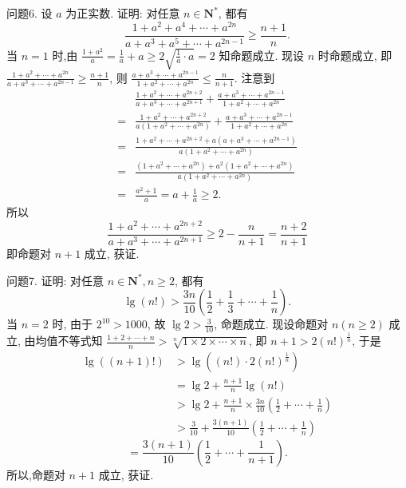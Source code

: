 问题6. 设 $a$ 为正实数.
证明: 对任意 $n \in \mathbf{N}^*$, 都有
$$
\frac{1+a^2+a^4+\cdots+a^{2 n}}{a+a^3+a^5+\cdots+a^{2 n-1}} \geqslant \frac{n+1}{n} .
$$
当 $n=1$ 时,由 $\frac{1+a^2}{a}=\frac{1}{a}+a \geqslant 2 \sqrt{\frac{1}{a} \cdot a}=2$ 知命题成立.
现设 $n$ 时命题成立, 即 $\frac{1+a^2+\cdots+a^{2 n}}{a+a^3+\cdots+a^{2 n-1}} \geqslant \frac{n+1}{n}$, 则 $\frac{a+a^3+\cdots+a^{2 n-1}}{1+a^2+\cdots+a^{2 n}} \leqslant \frac{n}{n+1}$.
注意到
$$
\begin{aligned}
& \frac{1+a^2+\cdots+a^{2 n+2}}{a+a^3+\cdots+a^{2 n+1}}+\frac{a+a^3+\cdots+a^{2 n-1}}{1+a^2+\cdots+a^{2 n}} \\
= & \frac{1+a^2+\cdots+a^{2 n+2}}{a\left(1+a^2+\cdots+a^{2 n}\right)}+\frac{a+a^3+\cdots+a^{2 n-1}}{1+a^2+\cdots+a^{2 n}} \\
= & \frac{1+a^2+\cdots+a^{2 n+2}+a\left(a+a^3+\cdots+a^{2 n-1}\right)}{a\left(1+a^2+\cdots+a^{2 n}\right)} \\
= & \frac{\left(1+a^2+\cdots+a^{2 n}\right)+a^2\left(1+a^2+\cdots+a^{2 n}\right)}{a\left(1+a^2+\cdots+a^{2 n}\right)} \\
= & \frac{a^2+1}{a}=a+\frac{1}{a} \geqslant 2 .
\end{aligned}
$$
所以
$$
\frac{1+a^2+\cdots+a^{2 n+2}}{a+a^3+\cdots+a^{2 n+1}} \geqslant 2-\frac{n}{n+1}=\frac{n+2}{n+1}
$$
即命题对 $n+1$ 成立, 获证.



问题7. 证明: 对任意 $n \in \mathbf{N}^*, n \geqslant 2$, 都有
$$
\lg (n !)>\frac{3 n}{10}\left(\frac{1}{2}+\frac{1}{3}+\cdots+\frac{1}{n}\right) .
$$
当 $n=2$ 时, 由于 $2^{10}>1000$, 故 $\lg 2>\frac{3}{10}$, 命题成立.
现设命题对 $n (n \geqslant 2)$ 成立, 由均值不等式知 $\frac{1+2+\cdots+n}{n}>\sqrt[n]{1 \times 2 \times \cdots \times n}$, 即 $n+1> 2(n !)^{\frac{1}{n}}$, 于是
$$
\begin{aligned}
\lg ((n+1) !) & >\lg \left((n !) \cdot 2(n !)^{\frac{1}{n}}\right) \\
& =\lg 2+\frac{n+1}{n} \lg (n !) \\
& >\lg 2+\frac{n+1}{n} \times \frac{3 n}{10}\left(\frac{1}{2}+\cdots+\frac{1}{n}\right) \\
& >\frac{3}{10}+\frac{3(n+1)}{10}\left(\frac{1}{2}+\cdots+\frac{1}{n}\right)
\end{aligned}
$$
$$
=\frac{3(n+1)}{10}\left(\frac{1}{2}+\cdots+\frac{1}{n+1}\right) .
$$
所以,命题对 $n+1$ 成立, 获证.



